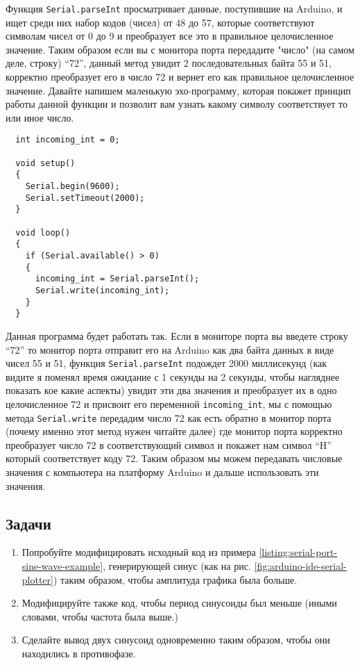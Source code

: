 \documentclass[../sparc.tex]{subfiles}
\begin{document}
Функция \texttt{Serial.parseInt} просматривает данные, поступившие на Arduino, и
ищет среди них набор кодов (чисел) от 48 до 57, которые соответствуют символам
чисел от 0 до 9 и преобразует все это в правильное целочисленное значение. Таким
образом если вы с монитора порта передадите "число" (на самом деле, строку)
``72'', данный метод увидит 2 последовательных байта 55 и 51, корректно
преобразует его в число 72 и вернет его как правильное целочисленное значение.
Давайте напишем маленькую эхо-программу, которая покажет принцип работы данной
функции и позволит вам узнать какому символу соответствует то или иное число.

\begin{verbatim}
  int incoming_int = 0;

  void setup()
  {
    Serial.begin(9600);
    Serial.setTimeout(2000);
  }

  void loop()
  {
    if (Serial.available() > 0)
    {
      incoming_int = Serial.parseInt();
      Serial.write(incoming_int);
    }
  }
\end{verbatim}

Данная программа будет работать так. Если в мониторе порта вы введете строку
``72'' то монитор порта отправит его на Arduino как два байта данных в виде
чисел 55 и 51, функция \texttt{Serial.parseInt} подождет 2000 миллисекунд (как
видите я поменял время ожидание с 1 секунды на 2 секунды, чтобы нагляднее
показать кое какие аспекты) увидит эти два значения и преобразует их в одно
целочисленное 72 и присвоит его переменной \texttt{incoming\_int}, мы с помощью
метода \texttt{Serial.write} передадим число 72 как есть обратно в монитор порта
(почему именно этот метод нужен читайте далее) где монитор порта корректно
преобразует число 72 в соответствующий символ и покажет нам символ ``H'' который
соответствует коду 72. Таким образом мы можем передавать числовые значения с
компьютера на платформу Arduino и дальше использовать эти значения.

\subsection{Задачи}

\begin{enumerate}
\item Попробуйте модифицировать исходный код из примера
  \ref{listing:serial-port-sine-wave-example}, генерирующей синус (как на
  рис. \ref{fig:arduino-ide-serial-plotter}) таким образом, чтобы амплитуда
  графика была больше.
\item Модифицируйте также код, чтобы период синусоиды был меньше (иными словами,
  чтобы частота была выше.)
\item Сделайте вывод двух синусоид одновременно таким образом, чтобы они
  находились в противофазе.
\end{enumerate}
\end{document}
